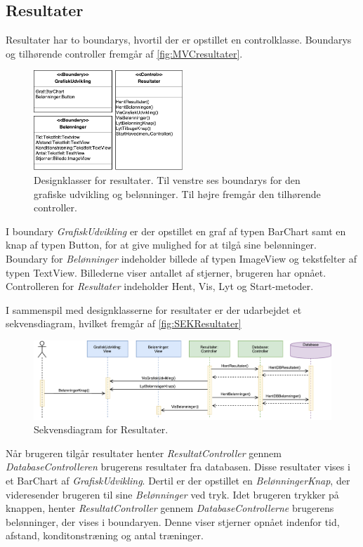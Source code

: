 \subsection*{Resultater}
Resultater har to boundarys, hvortil der er opstillet en controlklasse. Boundarys og tilhørende controller fremgår af \autoref{fig:MVCresultater}. 

\begin{figure} [H]
\centering
\includegraphics[width=0.5\textwidth]{figures/MVC/MVCResultater}
\caption{Designklasser for resultater. Til venstre ses boundarys for den grafiske udvikling og belønninger. Til højre fremgår den tilhørende controller.}
\label{fig:MVCresultater}
\end{figure}

\noindent
I boundary \textit{GrafiskUdvikling} er der opstillet en graf af typen BarChart samt en knap af typen Button, for at give mulighed for at tilgå sine belønninger. Boundary for \textit{Belønninger} indeholder billede af typen ImageView og tekstfelter af typen TextView. Billederne viser antallet af stjerner, brugeren har opnået.
Controlleren for \textit{Resultater} indeholder Hent, Vis, Lyt og Start-metoder. 

I sammenspil med designklasserne for resultater er der udarbejdet et sekvensdiagram, hvilket fremgår af \autoref{fig:SEKResultater}

\begin{figure} [H]
\centering
\includegraphics[width=1\textwidth]{figures/Sek/SEKResultater}
\caption{Sekvensdiagram for Resultater.}
\label{fig:SEKResultater}
\end{figure} 

\noindent 
Når brugeren tilgår resultater henter \textit{ResultatController} gennem \textit{DatabaseControlleren} brugerens resultater fra databasen. Disse resultater vises i et BarChart af \textit{GrafiskUdvikling}. Dertil er der opstillet en \textit{BelønningerKnap}, der videresender brugeren til sine \textit{Belønninger} ved tryk. Idet brugeren trykker på knappen, henter \textit{ResultatController} gennem \textit{DatabaseControllerne} brugerens belønninger, der vises i boundaryen. Denne viser stjerner opnået indenfor tid, afstand, konditonstræning og antal træninger.

